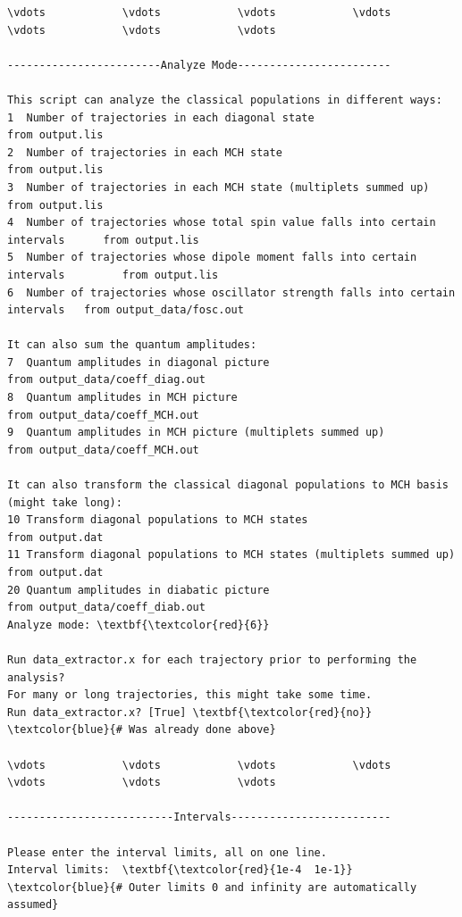 \documentclass[a4paper,11pt,DIV=15,openany]{scrbook}
\begin{document}
\begin{oframed}
\footnotesize\begin{Verbatim}[commandchars=\\\{\}]
\vdots            \vdots            \vdots            \vdots            \vdots            \vdots            \vdots            

------------------------Analyze Mode------------------------

This script can analyze the classical populations in different ways:
1  Number of trajectories in each diagonal state                                   from output.lis
2  Number of trajectories in each MCH state                                        from output.lis
3  Number of trajectories in each MCH state (multiplets summed up)                 from output.lis
4  Number of trajectories whose total spin value falls into certain intervals      from output.lis
5  Number of trajectories whose dipole moment falls into certain intervals         from output.lis
6  Number of trajectories whose oscillator strength falls into certain intervals   from output_data/fosc.out

It can also sum the quantum amplitudes:
7  Quantum amplitudes in diagonal picture                                    from output_data/coeff_diag.out
8  Quantum amplitudes in MCH picture                                         from output_data/coeff_MCH.out
9  Quantum amplitudes in MCH picture (multiplets summed up)                  from output_data/coeff_MCH.out

It can also transform the classical diagonal populations to MCH basis (might take long):
10 Transform diagonal populations to MCH states                              from output.dat
11 Transform diagonal populations to MCH states (multiplets summed up)       from output.dat
20 Quantum amplitudes in diabatic picture                                    from output_data/coeff_diab.out
Analyze mode: \textbf{\textcolor{red}{6}}

Run data_extractor.x for each trajectory prior to performing the analysis?
For many or long trajectories, this might take some time.
Run data_extractor.x? [True] \textbf{\textcolor{red}{no}}          \textcolor{blue}{# Was already done above}

\vdots            \vdots            \vdots            \vdots            \vdots            \vdots            \vdots            

--------------------------Intervals-------------------------

Please enter the interval limits, all on one line.
Interval limits:  \textbf{\textcolor{red}{1e-4  1e-1}}          \textcolor{blue}{# Outer limits 0 and infinity are automatically assumed}


\end{Verbatim}
\end{oframed}
\end{document}
